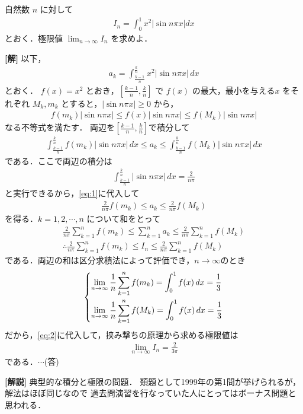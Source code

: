 \documentclass[a4paper,10pt]{ltjsarticle}
\begin{document}
\begin{oframed}
  自然数 $n$ に対して
  \begin{align*}
    I_n = \int_0^1 x^2 |\sin n\pi x| dx
  \end{align*}
  とおく．極限値 $\displaystyle \lim_{n \to \infty} I_n$ を求めよ．
\end{oframed}


\setlength{\columnseprule}{0.4pt}
\begin{multicols}{2}
  {\bf[解]}
  以下，
  \begin{align*}
    a_k = \int_{\frac{k-1}{n}}^{\frac{k}{n}} x^2 \left|\sin n\pi x\right| \,dx
  \end{align*}
  とおく．
  $f(x)=x^2$ とおき，$\left[ \frac{k-1}{n}, \frac{k}{n} \right]$ で $f(x)$ の最大，最小を与える$x$ をそれぞれ $M_k, m_k$ とすると，$|\sin n\pi x| \ge 0$ から，
  \begin{align*}
    f(m_k) |\sin n\pi x| \le f(x) |\sin n\pi x| \le f(M_k) |\sin n\pi x|
  \end{align*}
  なる不等式を満たす．
  両辺を$\left[ \frac{k-1}{n}, \frac{k}{n} \right]$で積分して
  \begin{align}
    \int_{\frac{k-1}{n}}^{\frac{k}{n}} f(m_k) |\sin n\pi x| \,dx \le a_k \le \int_{\frac{k-1}{n}}^{\frac{k}{n}} f(M_k) |\sin n\pi x| \,dx \label{eq:1}
  \end{align}
  である．ここで両辺の積分は
  \begin{align*}
    \int_{\frac{k-1}{n}}^{\frac{k}{n}} |\sin n\pi x| \,dx = \frac{2}{n\pi}
  \end{align*}
  と実行できるから，\cref{eq:1}に代入して
  \begin{align*}
    \frac{2}{n\pi} f(m_k) \le a_k \le \frac{2}{n\pi} f(M_k)
  \end{align*}
  を得る．$k=1,2,\cdots,n$ について和をとって
  \begin{align}
    \frac{2}{n\pi} \sum_{k=1}^{n} f(m_k) \le \sum_{k=1}^{n} a_k \le \frac{2}{n\pi} \sum_{k=1}^{n} f(M_k) \nonumber \\
    \therefore
    \frac{2}{n\pi} \sum_{k=1}^{n} f(m_k) \le I_n \le \frac{2}{n\pi} \sum_{k=1}^{n} f(M_k) \label{eq:2}
  \end{align}
  である．両辺の和は区分求積法によって評価でき，$n\to\infty$のとき
  \begin{align*}
    \begin{dcases}
      \lim_{n\to\infty}\frac{1}{n} \sum_{k=1}^{n} f(m_k) = \int_{0}^{1} f(x) \,dx = \frac{1}{3} \\
      \lim_{n\to\infty}\frac{1}{n} \sum_{k=1}^{n} f(M_k) = \int_{0}^{1} f(x) \,dx = \frac{1}{3}
    \end{dcases}
  \end{align*}
  だから，\cref{eq:2}に代入して，挟み撃ちの原理から求める極限値は
  \begin{align*}
    \lim_{n\to\infty}I_n = \frac{2}{3\pi}
  \end{align*}
  である．$\cdots$(答)


  \vspace{10pt}
  {\bf[解説]}
  典型的な積分と極限の問題．
  類題として1999年の第1問が挙げられるが，解法はほぼ同じなので
  過去問演習を行なっていた人にとってはボーナス問題と思われる．



  \newpage
\end{multicols}
\end{document}
